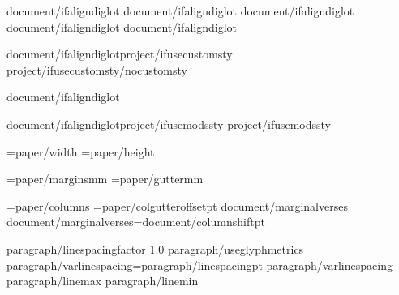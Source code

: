 


{document/ifaligndiglot}\diglottrue
{document/ifaligndiglot}\diglotcolumns
{document/ifaligndiglot}
{document/ifaligndiglot}
{document/ifaligndiglot}\initdiglot


{document/ifaligndiglot}{project/ifusecustomsty}
{project/ifusecustomsty}{/nocustomsty}

{document/ifaligndiglot} %

{document/ifaligndiglot}{project/ifusemodssty} %
{project/ifusemodssty} %

\PaperWidth={paper/width}
\PaperHeight={paper/height}

\MarginUnit={paper/margins}mm
\def\TopMarginFactor{{{paper/topmarginfactor}}}
\def\BottomMarginFactor{{{paper/bottommarginfactor}}}
\def\SideMarginFactor{{{paper/sidemarginfactor}}}
\BindingGutter={paper/gutter}mm

\BodyColumns={paper/columns}
\def\ColumnGutterFactor{{{document/colgutterfactor}}}
\ColumnGutterRuleSkip={paper/colgutteroffset}pt
{document/marginalverses}
{document/marginalverses}\columnshift={document/columnshift}pt

\def\LineSpacingFactor{L_}{{{paragraph/linespacingfactor}}}
\def\VerticalSpaceFactor{L_}{{1.0}}
{paragraph/useglyphmetrics}
{paragraph/varlinespacing}\baselineskip={paragraph/linespacing}pt {paragraph/varlinespacing} {paragraph/linemax} {paragraph/linemin}

